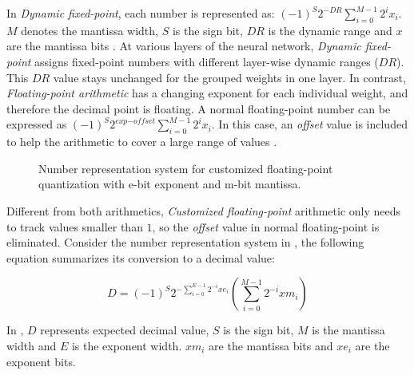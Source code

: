 \documentclass[a4paper,12pt]{report}
\begin{document}
In \textit{Dynamic fixed-point}, each number is represented as:
$(-1)^S2^{-\textit{DR}}\sum^{M-1}_{i=0}2^ix_i$.
$M$ denotes the mantissa width, $S$ is the sign bit, $\textit{DR}$ is the dynamic range
and $x$ are the mantissa bits \cite{courbariaux2014training, Gysel}.
At various layers of the neural network, \textit{Dynamic fixed-point} assigns
fixed-point numbers with different layer-wise dynamic ranges ($\textit{DR}$).
This $\textit{DR}$ value stays unchanged for the grouped weights in one layer.
In contrast, \textit{Floating-point arithmetic} has a changing exponent for each
individual weight, and therefore the decimal point is floating.
A normal floating-point number can be expressed as $(-1)^S2^{\textit{exp}-\textit{offset}}\sum^{M-1}_{i=0}2^ix_i$.
In this case, an \textit{offset} value is included to help the arithmetic to cover a large
range of values \cite{ercegovac2004digital}.
\begin{figure}[!h]
\centering
{}
\caption{Number representation system for customized floating-point quantization with
e-bit exponent and m-bit mantissa.}
\label{number_rep_dfp}
\end{figure}

Different from both arithmetics, \textit{Customized floating-point} arithmetic only
needs to track values smaller than $1$, so the \textit{offset} value in normal floating-point
is eliminated.
Consider the number representation system in , the following
equation summarizes its conversion to a decimal value:

\begin{equation} \label{equ:d2dfp2}
    D = (-1)^S 2^{-\sum^{E-1}_{i=0}2^{-i}xe_i}(\sum^{M-1}_{i=0}2^{-i}xm_i)
\end{equation}

In , $D$ represents expected decimal value, $S$ is the sign
bit, $M$ is the mantissa width and $E$ is the exponent width.
$xm_i$ are the mantissa bits and $xe_i$ are the exponent bits.
\end{document}
